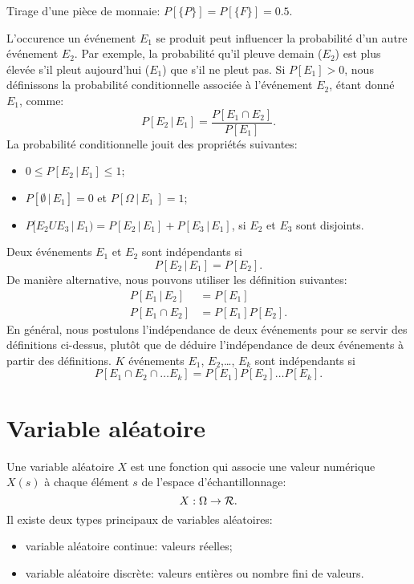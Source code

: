 \begin{example}
 Tirage d'une pièce de monnaie: $P[ \lbrace P \rbrace ] = P[ \lbrace F \rbrace ]= 0.5$.
\end{example}

L'occurence un événement $E_1$ se produit peut influencer la probabilité d'un autre événement $E_2$.
Par exemple, la probabilité qu'il pleuve demain ($E_2$) est plus élevée s'il pleut aujourd'hui ($E_1$) que s'il ne pleut pas.
Si $P[E_1] > 0$, nous définissons la probabilité conditionnelle associée à l'événement $E_2$, étant donné $E_1$, comme:
\[
P[E_2\,|\,E_1 ] = \frac{P[ E_1 \cap E_2 ]}{P[E_1]}.
\]
La probabilité conditionnelle jouit des propriétés suivantes:
\begin{itemize}
 \item 
  $0 \leq P[E_2\,|\,E_1] \leq 1$;
 \item
  $P[ \emptyset\,|\, E_1] = 0$ et $P[  \Omega\,|\,E_1\ ] = 1$;
 \item
  $P[E_2 U E_3\,|\,E_1) = P[E_2\,|\,E_1] + P[E_3\,|\,E_1]$, si $E_2$ et $E_3$ sont disjoints.
\end{itemize}

Deux événements $E_1$ et $E_2$ sont indépendants si
\[
 P[E_2\,|\,E_1] = P[E_2]. 
\]
De manière alternative, nous pouvons utiliser les définition suivantes:
\begin{align*}
P[E_1\,|\,E_2] &= P[E_1] \\
P[E_1 \cap E_2] &= P[E_1]P[E_2].
\end{align*}
En général, nous postulons l'indépendance de deux événements pour se servir des définitions ci-dessus,
plutôt que de déduire l'indépendance de deux événements à partir des définitions.
$K$ événements $E_1$, $E_2$,\ldots, $E_k$ sont indépendants si
\[
P[E_1 \cap E_2 \cap \ldots E_k] = P[E_1]P[E_2]\ldots P[E_k].
\]

\section{Variable aléatoire}

Une variable aléatoire $X$ est une fonction qui associe une valeur numérique
$X(s)$ à chaque élément $s$ de l'espace d'échantillonnage:
\[
X: \Omega \rightarrow \mathcal{R}.
\]
Il existe deux types principaux de variables aléatoires:
\begin{itemize}
 \item 
 variable aléatoire continue: valeurs réelles;
 \item
 variable aléatoire discrète: valeurs entières ou nombre fini de valeurs.
\end{itemize}


